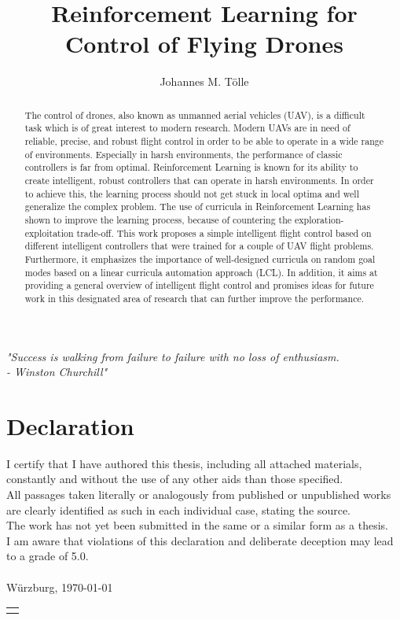\documentclass[bachelor,english]{infothesis}
\title{Reinforcement Learning for Control of Flying Drones}
\author{Johannes M. Tölle}
\newenvironment{declaration}
{\chapter*{Declaration}}
{}
\begin{document}
\vspace*{\fill}
\begin{center}
	\Huge
	\emph{"Success is walking from failure to failure with no loss of enthusiasm.\\
	\qquad \qquad \qquad- Winston Churchill"}
\end{center}
\vspace*{\fill}
\thispagestyle{empty}
\newpage
{}
	
\begin{declaration}
	I certify that I have authored this thesis, including all attached materials,
	constantly and without the use of any other aids than those specified.\\
	All passages taken literally or analogously from published or unpublished works
	are clearly identified as such in each individual case, stating the source.\\
	The work has not yet been submitted in the same or a similar form as a thesis.\\
	I am aware that violations of this declaration and deliberate deception may lead to
	a grade of 5.0.\\
	\vspace*{12cm}\\
	Würzburg, \today 
	\hspace*{\fill}\begin{tabular}{@{}l@{}}\hline
	\makebox[4cm]{Johannes M. Tölle}
	\end{tabular}
\end{declaration}

\tableofcontents
\listoffigures
\listoftables
\listofalgorithms

\begin{abstract}
	The control of drones, also known as unmanned aerial vehicles (UAV), 
	is a difficult task which is of great interest to modern research.
	Modern UAVs are in need of reliable, precise, and robust flight control in order to
	be able to operate in a wide range of environments. Especially in harsh environments,
	the performance of classic controllers is far from optimal.
	Reinforcement Learning is known for its ability to create intelligent, robust
	controllers that can operate in harsh environments. In order to achieve this, the learning process
	should not get stuck in local optima and well generalize the complex problem. The use 
	of curricula in Reinforcement Learning has shown to improve the learning process, because
	of countering the exploration-exploitation trade-off.
	This work proposes a simple intelligent flight control based on 
	different intelligent controllers that were trained for
	a couple of UAV flight problems. Furthermore, it emphasizes the importance of 
	well-designed curricula on random goal modes based on a linear curricula automation approach (LCL).
	In addition, it aims at providing a general overview of intelligent flight
	control and promises ideas for future work in this designated area of research that can further improve 
	the performance.
\end{abstract}
\end{document}
